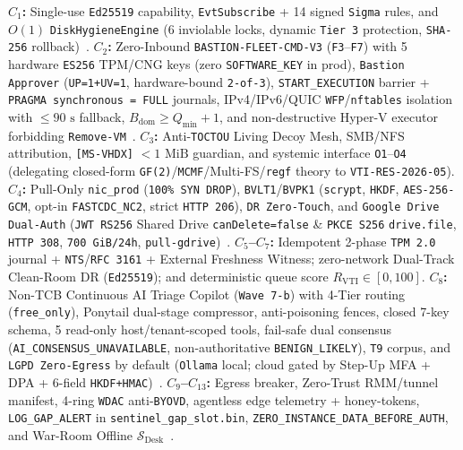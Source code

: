 \documentclass[10pt,twocolumn]{article}
\begin{document}
\textbf{$C_1$:} Single-use \texttt{Ed25519} capability, \texttt{EvtSubscribe} + 14 signed \texttt{Sigma} rules, and $O(1)$ \texttt{DiskHygieneEngine} (6 inviolable locks, dynamic \texttt{Tier 3} protection, \texttt{SHA-256} rollback)~\cite{R46,R47,R53}.
\textbf{$C_2$:} Zero-Inbound \texttt{BASTION-FLEET-CMD-V3} (\texttt{F3}--\texttt{F7}) with 5 hardware \texttt{ES256} TPM/CNG keys (zero \texttt{SOFTWARE\_KEY} in prod), \texttt{Bastion Approver} (\texttt{UP=1+UV=1}, hardware-bound \texttt{2-of-3}), \texttt{START\_EXECUTION} barrier + \texttt{PRAGMA synchronous = FULL} journals, IPv4/IPv6/QUIC \texttt{WFP}/\texttt{nftables} isolation with $\le 90\text{ s}$ fallback, $B_{\mathrm{dom}} \ge Q_{\min}+1$, and non-destructive Hyper-V executor forbidding \texttt{Remove-VM}~\cite{R04,R41,R44,R45,R49,R59,R61,R62}.
\textbf{$C_3$:} Anti-\texttt{TOCTOU} Living Decoy Mesh, SMB/NFS attribution, \texttt{[MS-VHDX]} $< 1\text{ MiB}$ guardian, and systemic interface \texttt{O1}--\texttt{O4} (delegating closed-form \texttt{GF(2)}/\texttt{MCMF}/Multi-FS/\texttt{regf} theory to \texttt{VTI-RES-2026-05}).
\textbf{$C_4$:} Pull-Only \texttt{nic\_prod} (\texttt{100\% SYN DROP}), \texttt{BVLT1}/\texttt{BVPK1} (\texttt{scrypt}, \texttt{HKDF}, \texttt{AES-256-GCM}, opt-in \texttt{FASTCDC\_NC2}, strict \texttt{HTTP 206}), \texttt{DR Zero-Touch}, and \texttt{Google Drive Dual-Auth} (\texttt{JWT RS256} Shared Drive \texttt{canDelete=false} \& \texttt{PKCE S256} \texttt{drive.file}, \texttt{HTTP 308}, \texttt{700 GiB/24h}, \texttt{pull-gdrive})~\cite{R02,R33,R35,R36,R37,R38,R50,R51}.
\textbf{$C_5$--$C_7$:} Idempotent 2-phase \texttt{TPM 2.0} journal + \texttt{NTS}/\texttt{RFC 3161} + External Freshness Witness; zero-network Dual-Track Clean-Room DR (\texttt{Ed25519}); and deterministic queue score $R_{\mathrm{VTI}} \in [0,100]$.
\textbf{$C_8$:} Non-TCB Continuous AI Triage Copilot (\texttt{Wave 7-b}) with 4-Tier routing (\texttt{free\_only}), Ponytail dual-stage compressor, anti-poisoning fences, closed 7-key schema, 5 read-only host/tenant-scoped tools, fail-safe dual consensus (\texttt{AI\_CONSENSUS\_UNAVAILABLE}, non-authoritative \texttt{BENIGN\_LIKELY}), \texttt{T9} corpus, and \texttt{LGPD Zero-Egress} by default (\texttt{Ollama} local; cloud gated by Step-Up MFA + DPA + 6-field \texttt{HKDF+HMAC})~\cite{R54,R55,R56,R57,R58}.
\textbf{$C_9$--$C_{13}$:} Egress breaker, Zero-Trust RMM/tunnel manifest, 4-ring \texttt{WDAC} anti-\texttt{BYOVD}, agentless edge telemetry + honey-tokens, \texttt{LOG\_GAP\_ALERT} in \texttt{sentinel\_gap\_slot.bin}, \texttt{ZERO\_INSTANCE\_DATA\_BEFORE\_AUTH}, and War-Room Offline $\mathcal{S}_{\mathrm{Desk}}$~\cite{R29,R30,R31,R32}.
\end{document}
